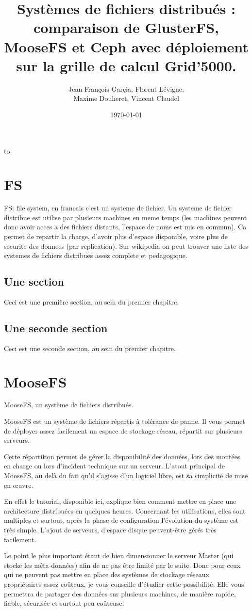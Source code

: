 \documentclass[12pt]{report}
\date{\today}
\author{}
\title{}
\title{\textcolor[RGB]{153,0,0}{Systèmes de fichiers distribués : comparaison de GlusterFS, MooseFS et Ceph avec déploiement sur la grille de calcul Grid’5000.}}
\author{Jean-François Garçia, Florent Lévigne,\\Maxime Douheret, Vincent Claudel}
\makeatletter
\def\clap#1{\hbox to 0pt{\hss #1\hss}}%
\def\haut#1#2#3{%
\hbox to \hsize{%
\rlap{\vtop{\raggedright #1}}%
\hss
\clap{\vtop{\centering #2}}%
\hss
\llap{\vtop{\raggedleft #3}}}}%
\def\bas#1#2#3{%
\hbox to \hsize{%
\rlap{\vbox{\raggedright #1}}%
\hss
\clap{\vbox{\centering #2}}%
\hss
\llap{\vbox{\raggedleft #3}}}}%
\def\maketitle{%
\thispagestyle{empty}\vbox to \vsize{%
\haut{}{\@blurb}{}
\vfill
\vspace{1cm}
\begin{flushleft}
\usefont{OT1}{ptm}{m}{n}
\huge \@title
\end{flushleft}
\par
\hrule height 4pt
\par
\begin{flushright}
\usefont{OT1}{phv}{m}{n}
\Large \@author
\par
\end{flushright}
\vspace{1cm}
\vfill
\vfill
\bas{}{\@location, le \@date}{}
}%
\cleardoublepage
}
\makeatother
\begin{document}
     \maketitle
    \tableofcontents    
    \chapter{FS}
    FS: file system, en francais c'est un systeme de fichier.
Un systeme de fichier distribue est utilise par plusieurs
machines en meme temps (les machines peuvent donc
avoir acces a des fichiers distants, l'espace de noms est mis en commun).
Ca permet de repartir la charge, d'avoir plus d'espace disponible,
voire plus de securite des donnees (par replication).
Sur wikipedia on peut trouver une liste des systemes de fichiers
distribues assez complete et pedagogique.
    \section{Une section}
    Ceci est une première section, au sein du premier chapitre.
    \section{Une seconde section}
    Ceci est une seconde section, au sein du premier chapitre.
    \chapter{MooseFS}
    
MooseFS, un système de fichiers distribués.

MooseFS est un système de fichiers répartis à tolérance de panne. Il vous permet de déployer assez facilement un espace de stockage réseau, répartit sur plusieurs serveurs.

Cette répartition permet de gérer la disponibilité des données, lors des montées en charge ou lors d’incident technique sur un serveur. L’atout principal de MooseFS, au delà du fait qu’il s’agisse d’un logiciel libre, est sa simplicité de mise en œuvre.

En effet le tutorial, disponible ici, explique bien comment mettre en place une architecture distribuées en quelques heures. Concernant les utilisations, elles sont multiples et surtout, après la phase de configuration l’évolution du système est très simple. L’ajout de serveurs, d’espace disque peuvent-être gérés très facilement.

Le point le plus important étant de bien dimensionner le serveur Master (qui stocke les méta-données) afin de ne pas être limité par le suite. Donc pour ceux qui ne peuvent pas mettre en place des systèmes de stockage réseaux propriétaires assez coûteux, je vous conseille d’étudier cette possibilité. Elle vous permettra de partager des données sur plusieurs machines, de manière rapide, fiable, sécurisée et surtout peu coûteuse.
\end{document}
